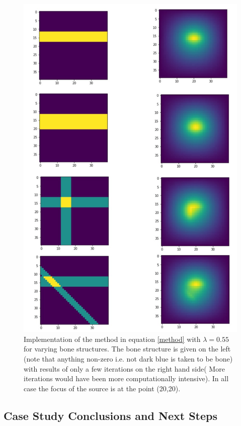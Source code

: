 \documentclass[11pt]{article} %
\begin{document}
\begin{figure}
	\centering
	\includegraphics[height=0.8\textheight]{"Report_images/various bone structures"}
	\caption{Implementation of the method in equation  \ref{method} with $ \lambda=0.55 $ for varying bone structures. The bone structure is given on the left (note that anything non-zero i.e. not dark blue is taken to be bone) with results of only a few iterations on the right hand side( More iterations would have been more computationally intensive). In all case the focus of the source is at the point (20,20). }
	\label{fig:various-bone-structures}
\end{figure}



\subsection{Case Study Conclusions and Next Steps}
\end{document}
